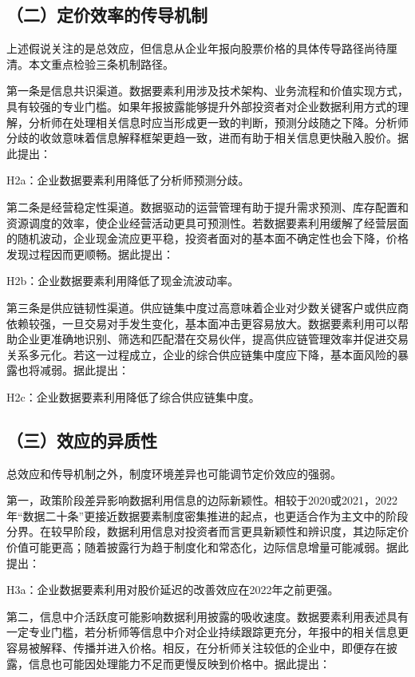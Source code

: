 \subsection{（二）定价效率的传导机制}\label{ux4e8cux5b9aux4ef7ux6548ux7387ux7684ux4f20ux5bfcux673aux5236}

上述假说关注的是总效应，但信息从企业年报向股票价格的具体传导路径尚待厘清。本文重点检验三条机制路径。

第一条是信息共识渠道。数据要素利用涉及技术架构、业务流程和价值实现方式，具有较强的专业门槛。如果年报披露能够提升外部投资者对企业数据利用方式的理解，分析师在处理相关信息时应当形成更一致的判断，预测分歧随之下降。分析师分歧的收敛意味着信息解释框架更趋一致，进而有助于相关信息更快融入股价。据此提出：

H2a：企业数据要素利用降低了分析师预测分歧。

第二条是经营稳定性渠道。数据驱动的运营管理有助于提升需求预测、库存配置和资源调度的效率，使企业经营活动更具可预测性。若数据要素利用缓解了经营层面的随机波动，企业现金流应更平稳，投资者面对的基本面不确定性也会下降，价格发现过程因而更顺畅。据此提出：

H2b：企业数据要素利用降低了现金流波动率。

第三条是供应链韧性渠道。供应链集中度过高意味着企业对少数关键客户或供应商依赖较强，一旦交易对手发生变化，基本面冲击更容易放大。数据要素利用可以帮助企业更准确地识别、筛选和匹配潜在交易伙伴，提高供应链管理效率并促进交易关系多元化。若这一过程成立，企业的综合供应链集中度应下降，基本面风险的暴露也将减弱。据此提出：

H2c：企业数据要素利用降低了综合供应链集中度。

\subsection{（三）效应的异质性}\label{ux4e09ux6548ux5e94ux7684ux5f02ux8d28ux6027}

总效应和传导机制之外，制度环境差异也可能调节定价效应的强弱。

第一，政策阶段差异影响数据利用信息的边际新颖性。相较于2020或2021，2022年``数据二十条''更接近数据要素制度密集推进的起点，也更适合作为主文中的阶段分界。在较早阶段，数据利用信息对投资者而言更具新颖性和辨识度，其边际定价价值可能更高；随着披露行为趋于制度化和常态化，边际信息增量可能减弱。据此提出：

H3a：企业数据要素利用对股价延迟的改善效应在2022年之前更强。

第二，信息中介活跃度可能影响数据利用披露的吸收速度。数据要素利用表述具有一定专业门槛，若分析师等信息中介对企业持续跟踪更充分，年报中的相关信息更容易被解释、传播并进入价格。相反，在分析师关注较低的企业中，即便存在披露，信息也可能因处理能力不足而更慢反映到价格中。据此提出：

